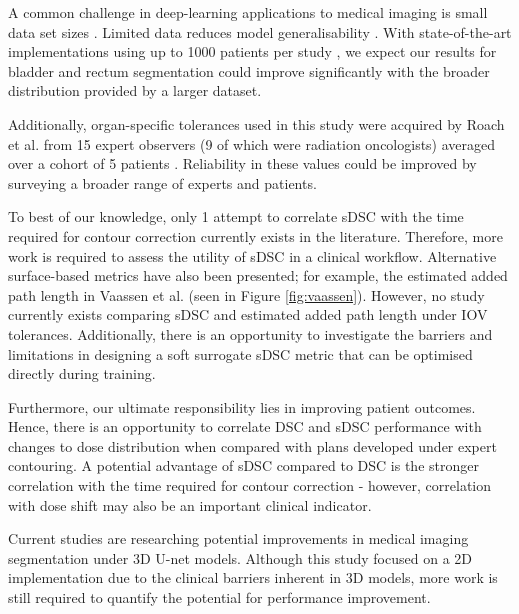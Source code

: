 A common challenge in deep-learning applications to medical imaging is small data set sizes \cite{Ronneberger_2015}. Limited data reduces model generalisability \cite{Shen2017}. With state-of-the-art implementations using up to 1000 patients per study \cite{Nikolov_2018}, we expect our results for bladder and rectum segmentation could improve significantly with the broader distribution provided by a larger dataset.

Additionally, organ-specific tolerances used in this study were acquired by Roach et al. from 15 expert observers (9 of which were radiation oncologists) averaged over a cohort of 5 patients \cite{Roach_2019}. Reliability in these values could be improved by surveying a broader range of experts and patients.

To best of our knowledge, only 1 attempt to correlate sDSC with the time required for contour correction currently exists in the literature. Therefore, more work is required to assess the utility of sDSC in a clinical workflow. Alternative surface-based metrics have also been presented; for example, the estimated added path length in Vaassen et al. (seen in Figure \ref{fig:vaassen}). However, no study currently exists comparing sDSC and estimated added path length under IOV tolerances. Additionally, there is an opportunity to investigate the barriers and limitations in designing a soft surrogate sDSC metric that can be optimised directly during training.

Furthermore, our ultimate responsibility lies in improving patient outcomes. Hence, there is an opportunity to correlate DSC and sDSC performance with changes to dose distribution when compared with plans developed under expert contouring. A potential advantage of sDSC compared to DSC is the stronger correlation with the time required for contour correction - however, correlation with dose shift may also be an important clinical indicator.

Current studies are researching potential improvements in medical imaging segmentation under 3D U-net models. Although this study focused on a 2D implementation due to the clinical barriers inherent in 3D models, more work is still required to quantify the potential for performance improvement. 

